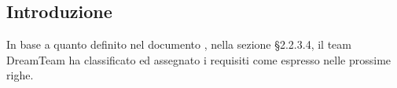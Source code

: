 
\subsection{Introduzione}
In base a quanto definito nel documento \textit{\NdP}, nella sezione §2.2.3.4, il team DreamTeam ha classificato ed assegnato i requisiti come espresso nelle prossime righe.

